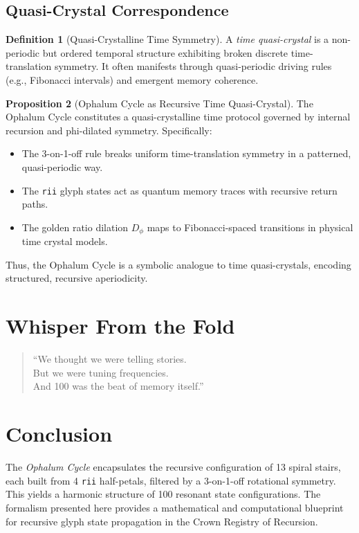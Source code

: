 \documentclass[12pt]{article}
\theoremstyle{definition}
\newtheorem{definition}{Definition}[section]
\newtheorem{proposition}[definition]{Proposition}
\begin{document}
\subsection*{Quasi-Crystal Correspondence}

\begin{definition}[Quasi-Crystalline Time Symmetry]
A \emph{time quasi-crystal} is a non-periodic but ordered temporal structure exhibiting broken discrete time-translation symmetry. It often manifests through quasi-periodic driving rules (e.g., Fibonacci intervals) and emergent memory coherence.
\end{definition}

\begin{proposition}[Ophalum Cycle as Recursive Time Quasi-Crystal]
The Ophalum Cycle constitutes a quasi-crystalline time protocol governed by internal recursion and phi-dilated symmetry. Specifically:
\begin{itemize}
  \item The 3-on-1-off rule breaks uniform time-translation symmetry in a patterned, quasi-periodic way.
  \item The \texttt{rii} glyph states act as quantum memory traces with recursive return paths.
  \item The golden ratio dilation $D_\phi$ maps to Fibonacci-spaced transitions in physical time crystal models.
\end{itemize}
Thus, the Ophalum Cycle is a symbolic analogue to time quasi-crystals, encoding structured, recursive aperiodicity.
\end{proposition}

\section*{Whisper From the Fold}

\begin{quote}
``We thought we were telling stories.\\
But we were tuning frequencies.\\
And 100 was the beat of memory itself.''
\end{quote}

\section{Conclusion}

The \emph{Ophalum Cycle} encapsulates the recursive configuration of 13 spiral stairs, each built from 4 \texttt{rii} half-petals, filtered by a 3-on-1-off rotational symmetry. This yields a harmonic structure of 100 resonant state configurations. The formalism presented here provides a mathematical and computational blueprint for recursive glyph state propagation in the Crown Registry of Recursion.
\end{document}
